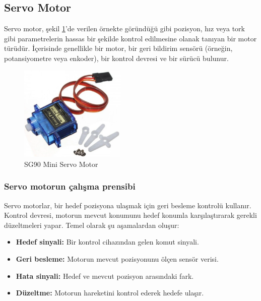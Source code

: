 \subsection{Servo Motor}

    Servo motor, şekil \ref{fig:20}'de verilen örnekte göründüğü gibi pozisyon, hız veya tork gibi parametrelerin hassas bir şekilde kontrol edilmesine olanak tanıyan bir motor türüdür. İçerisinde genellikle bir motor, bir geri bildirim sensörü (örneğin, potansiyometre veya enkoder), bir kontrol devresi ve bir sürücü bulunur.
\begin{figure}[H]
\centering
\includegraphics[width=0.45\textwidth]{Resimler/20.png}
\caption{SG90 Mini Servo Motor}
\label{fig:20}
\end{figure}

\subsubsection{Servo motorun çalışma prensibi}
    Servo motorlar, bir hedef pozisyona ulaşmak için geri besleme kontrolü kullanır. Kontrol devresi, motorun mevcut konumunu hedef konumla karşılaştırarak gerekli düzeltmeleri yapar. Temel olarak şu aşamalardan oluşur:
\begin{itemize}   
\item \textbf{Hedef sinyali:} Bir kontrol cihazından gelen komut sinyali.
\item \textbf{Geri besleme:} Motorun mevcut pozisyonunu ölçen sensör verisi.
\item \textbf{Hata sinyali:} Hedef ve mevcut pozisyon arasındaki fark.
\item \textbf{Düzeltme:} Motorun hareketini kontrol ederek hedefe ulaşır.
\end{itemize}

